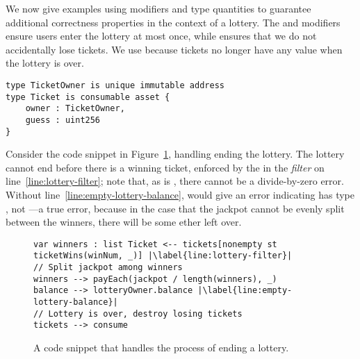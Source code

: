 \documentclass[nonacm, dvipsnames, sigconf]{acmart}
\begin{document}
We now give examples using modifiers and type quantities to guarantee additional correctness properties in the context of a lottery.
The  and  modifiers ensure users enter the lottery at most once, while  ensures that we do not accidentally lose tickets.
We use  because tickets no longer have any value when the lottery is over.
\begin{lstlisting}[language=flow]
type TicketOwner is unique immutable address
type Ticket is consumable asset {
    owner : TicketOwner,
    guess : uint256
}
\end{lstlisting}
Consider the code snippet in Figure~\ref{fig:lottery-end}, handling ending the lottery.
The lottery cannot end before there is a winning ticket, enforced by the  in the \emph{filter} on line~\ref{line:lottery-filter}; note that, as  is , there cannot be a divide-by-zero error.
Without line~\ref{line:empty-lottery-balance}, \langName would give an error indicating  has type , not ---a true error, because in the case that the jackpot cannot be evenly split between the winners, there will be some ether left over.
\begin{figure}
    \centering
\begin{lstlisting}[language=flow, xleftmargin=-0.5em]
var winners : list Ticket <-- tickets[nonempty st ticketWins(winNum, _)] |\label{line:lottery-filter}|
// Split jackpot among winners
winners --> payEach(jackpot / length(winners), _)
balance --> lotteryOwner.balance |\label{line:empty-lottery-balance}|
// Lottery is over, destroy losing tickets
tickets --> consume
\end{lstlisting}
    \caption{A code snippet that handles the process of ending a lottery.}
    \label{fig:lottery-end}
\end{figure}
\end{document}
